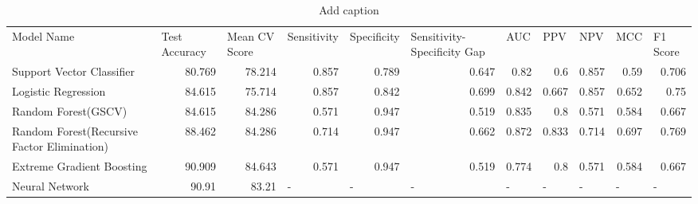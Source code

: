 \begin{table}[htbp]
  \centering
  \caption{Add caption}
    \begin{tabular}{lrrllllllll}
    Model Name & \multicolumn{1}{l}{Test Accuracy} & \multicolumn{1}{l}{Mean CV Score} & Sensitivity & Specificity & Sensitivity-Specificity Gap & AUC   & PPV   & NPV   & MCC   & F1 Score \\
    Support Vector Classifier & 80.769 & 78.214 & \multicolumn{1}{r}{0.857} & \multicolumn{1}{r}{0.789} & \multicolumn{1}{r}{0.647} & \multicolumn{1}{r}{0.82} & \multicolumn{1}{r}{0.6} & \multicolumn{1}{r}{0.857} & \multicolumn{1}{r}{0.59} & \multicolumn{1}{r}{0.706} \\
    Logistic Regression & 84.615 & 75.714 & \multicolumn{1}{r}{0.857} & \multicolumn{1}{r}{0.842} & \multicolumn{1}{r}{0.699} & \multicolumn{1}{r}{0.842} & \multicolumn{1}{r}{0.667} & \multicolumn{1}{r}{0.857} & \multicolumn{1}{r}{0.652} & \multicolumn{1}{r}{0.75} \\
    Random Forest(GSCV) & 84.615 & 84.286 & \multicolumn{1}{r}{0.571} & \multicolumn{1}{r}{0.947} & \multicolumn{1}{r}{0.519} & \multicolumn{1}{r}{0.835} & \multicolumn{1}{r}{0.8} & \multicolumn{1}{r}{0.571} & \multicolumn{1}{r}{0.584} & \multicolumn{1}{r}{0.667} \\
    Random Forest(Recursive Factor Elimination) & 88.462 & 84.286 & \multicolumn{1}{r}{0.714} & \multicolumn{1}{r}{0.947} & \multicolumn{1}{r}{0.662} & \multicolumn{1}{r}{0.872} & \multicolumn{1}{r}{0.833} & \multicolumn{1}{r}{0.714} & \multicolumn{1}{r}{0.697} & \multicolumn{1}{r}{0.769} \\
    Extreme Gradient Boosting & 90.909 & 84.643 & \multicolumn{1}{r}{0.571} & \multicolumn{1}{r}{0.947} & \multicolumn{1}{r}{0.519} & \multicolumn{1}{r}{0.774} & \multicolumn{1}{r}{0.8} & \multicolumn{1}{r}{0.571} & \multicolumn{1}{r}{0.584} & \multicolumn{1}{r}{0.667} \\
    Neural Network & 90.91 & 83.21 & -     & -     & -     & -     & -     & -     & -     & - \\
    \end{tabular}%
  \label{tab:addlabel}%
\end{table}%

